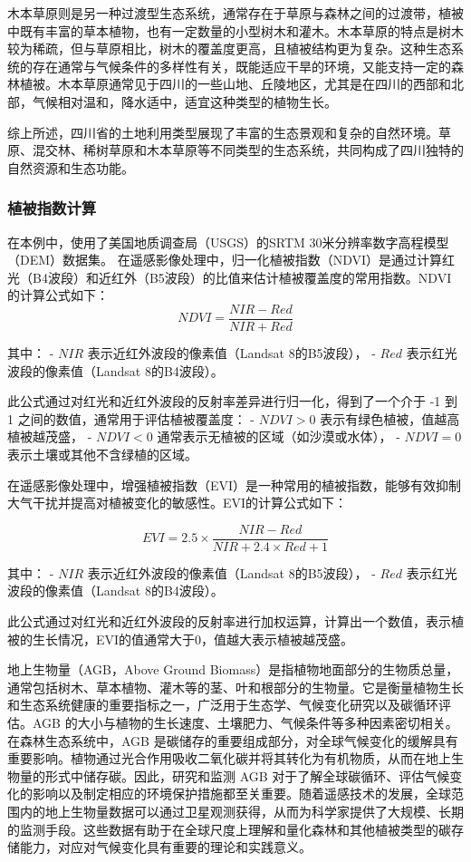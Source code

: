 \documentclass{article}
\begin{document}
		木本草原则是另一种过渡型生态系统，通常存在于草原与森林之间的过渡带，植被中既有丰富的草本植物，也有一定数量的小型树木和灌木。木本草原的特点是树木较为稀疏，但与草原相比，树木的覆盖度更高，且植被结构更为复杂。这种生态系统的存在通常与气候条件的多样性有关，既能适应干旱的环境，又能支持一定的森林植被。木本草原通常见于四川的一些山地、丘陵地区，尤其是在四川的西部和北部，气候相对温和，降水适中，适宜这种类型的植物生长。
		
		综上所述，四川省的土地利用类型展现了丰富的生态景观和复杂的自然环境。草原、混交林、稀树草原和木本草原等不同类型的生态系统，共同构成了四川独特的自然资源和生态功能。
		\subsubsection{植被指数计算}
		
				
		在本例中，使用了美国地质调查局（USGS）的SRTM 30米分辨率数字高程模型（DEM）数据集。
		在遥感影像处理中，归一化植被指数（NDVI）是通过计算红光（B4波段）和近红外（B5波段）的比值来估计植被覆盖度的常用指数。NDVI的计算公式如下：
		\[
		NDVI = \frac{NIR - Red}{NIR + Red}
		\]
		
		其中：
		- \( NIR \) 表示近红外波段的像素值（Landsat 8的B5波段），
		- \( Red \) 表示红光波段的像素值（Landsat 8的B4波段）。
		
		此公式通过对红光和近红外波段的反射率差异进行归一化，得到了一个介于 -1 到 1 之间的数值，通常用于评估植被覆盖度：
		- \( NDVI > 0 \) 表示有绿色植被，值越高植被越茂盛，
		- \( NDVI < 0 \) 通常表示无植被的区域（如沙漠或水体），
		- \( NDVI = 0 \) 表示土壤或其他不含绿植的区域。
		
		在遥感影像处理中，增强植被指数（EVI）是一种常用的植被指数，能够有效抑制大气干扰并提高对植被变化的敏感性。EVI的计算公式如下：
		
		\[
		EVI = 2.5 \times \frac{NIR - Red}{NIR + 2.4 \times Red + 1}
		\]
		
		其中：
		- \( NIR \) 表示近红外波段的像素值（Landsat 8的B5波段），
		- \( Red \) 表示红光波段的像素值（Landsat 8的B4波段）。
		
		此公式通过对红光和近红外波段的反射率进行加权运算，计算出一个数值，表示植被的生长情况，EVI的值通常大于0，值越大表示植被越茂盛。
		\par
		地上生物量（AGB，Above Ground Biomass）是指植物地面部分的生物质总量，通常包括树木、草本植物、灌木等的茎、叶和根部分的生物量。它是衡量植物生长和生态系统健康的重要指标之一，广泛用于生态学、气候变化研究以及碳循环评估。AGB 的大小与植物的生长速度、土壤肥力、气候条件等多种因素密切相关。在森林生态系统中，AGB 是碳储存的重要组成部分，对全球气候变化的缓解具有重要影响。植物通过光合作用吸收二氧化碳并将其转化为有机物质，从而在地上生物量的形式中储存碳。因此，研究和监测 AGB 对于了解全球碳循环、评估气候变化的影响以及制定相应的环境保护措施都至关重要。随着遥感技术的发展，全球范围内的地上生物量数据可以通过卫星观测获得，从而为科学家提供了大规模、长期的监测手段。这些数据有助于在全球尺度上理解和量化森林和其他植被类型的碳存储能力，对应对气候变化具有重要的理论和实践意义。
\end{document}
